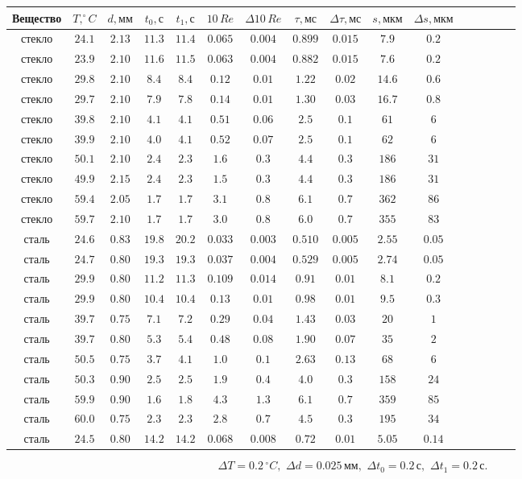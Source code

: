 \begin{center}
\begin{tabular}{|c|c|c|c|c|c|c|c|c|c|c|c|c|c|c|c|}\hline
Вещество&$T, ^\circ C$&$d, \text{мм}$&$t_0, \text{с}$&$t_1, \text{с}$&$10\,Re$&$\Delta 10\,Re$
&$\tau, \text{мс}$&$\Delta \tau, \text{мс}$
&$s, \text{мкм}$&$\Delta s, \text{мкм}$
\\ \hline
стекло&$24.1$&$2.13$&$11.3$&$11.4$&$0.065$&$0.004$&$0.899$&$0.015$&$7.9$&$0.2$\\ \hline
стекло&$23.9$&$2.10$&$11.6$&$11.5$&$0.063$&$0.004$&$0.882$&$0.015$&$7.6$&$0.2$\\ \hline
стекло&$29.8$&$2.10$&$8.4$&$8.4$&$0.12$&$0.01$&$1.22$&$0.02$&$14.6$&$0.6$\\ \hline
стекло&$29.7$&$2.10$&$7.9$&$7.8$&$0.14$&$0.01$&$1.30$&$0.03$&$16.7$&$0.8$\\ \hline
стекло&$39.8$&$2.10$&$4.1$&$4.1$&$0.51$&$0.06$&$2.5$&$0.1$&$61$&$6$\\ \hline
стекло&$39.9$&$2.10$&$4.0$&$4.1$&$0.52$&$0.07$&$2.5$&$0.1$&$62$&$6$\\ \hline
стекло&$50.1$&$2.10$&$2.4$&$2.3$&$1.6$&$0.3$&$4.4$&$0.3$&$186$&$31$\\ \hline
стекло&$49.9$&$2.15$&$2.4$&$2.3$&$1.5$&$0.3$&$4.4$&$0.3$&$186$&$31$\\ \hline
стекло&$59.4$&$2.05$&$1.7$&$1.7$&$3.1$&$0.8$&$6.1$&$0.7$&$362$&$86$\\ \hline
стекло&$59.7$&$2.10$&$1.7$&$1.7$&$3.0$&$0.8$&$6.0$&$0.7$&$355$&$83$\\ \hline
сталь&$24.6$&$0.83$&$19.8$&$20.2$&$0.033$&$0.003$&$0.510$&$0.005$&$2.55$&$0.05$\\ \hline
сталь&$24.7$&$0.80$&$19.3$&$19.3$&$0.037$&$0.004$&$0.529$&$0.005$&$2.74$&$0.05$\\ \hline
сталь&$29.9$&$0.80$&$11.2$&$11.3$&$0.109$&$0.014$&$0.91$&$0.01$&$8.1$&$0.2$\\ \hline
сталь&$29.9$&$0.80$&$10.4$&$10.4$&$0.13$&$0.01$&$0.98$&$0.01$&$9.5$&$0.3$\\ \hline
сталь&$39.7$&$0.75$&$7.1$&$7.2$&$0.29$&$0.04$&$1.43$&$0.03$&$20$&$1$\\ \hline
сталь&$39.7$&$0.80$&$5.3$&$5.4$&$0.48$&$0.08$&$1.90$&$0.07$&$35$&$2$\\ \hline
сталь&$50.5$&$0.75$&$3.7$&$4.1$&$1.0$&$0.1$&$2.63$&$0.13$&$68$&$6$\\ \hline
сталь&$50.3$&$0.90$&$2.5$&$2.5$&$1.9$&$0.4$&$4.0$&$0.3$&$158$&$24$\\ \hline
сталь&$59.9$&$0.90$&$1.6$&$1.8$&$4.3$&$1.3$&$6.1$&$0.7$&$359$&$85$\\ \hline
сталь&$60.0$&$0.75$&$2.3$&$2.3$&$2.8$&$0.7$&$4.5$&$0.3$&$195$&$34$\\ \hline
сталь&$24.5$&$0.80$&$14.2$&$14.2$&$0.068$&$0.008$&$0.72$&$0.01$&$5.05$&$0.14$\\ \hline
\end{tabular}
\end{center}
$$\Delta T=0.2\, ^\circ C,\,\,\Delta d=0.025\, \text{мм},\,\,\Delta t_0=0.2\, \text{с},\,\,\Delta t_1=0.2\, \text{с}.$$

